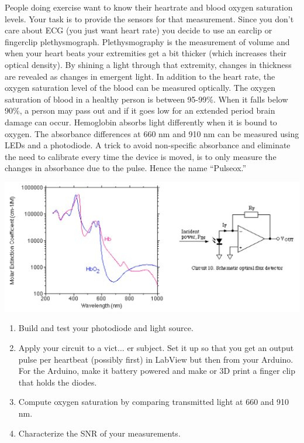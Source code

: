\documentclass[12pt]{article}
\begin{document}
People doing exercise want to know their heartrate and blood oxygen saturation levels.
Your task is to provide the sensors for that measurement. 
Since you don't care about ECG (you just want heart rate) you decide to use an earclip or fingerclip plethysmograph. 
Plethysmography is the measurement of volume and when your heart beats your extremities get a bit thicker (which increases their optical density). 
By shining a light through that extremity, changes in thickness are revealed as changes in emergent light. 
In addition to the heart rate, the oxygen saturation level of the blood can be measured optically. 
The oxygen saturation of blood in a healthy person is between 95-99\%. 
When it falls below 90\%, a person may pass out and if it goes low for an extended period brain damage can occur. 
Hemoglobin absorbs light differently when it is bound to oxygen. 
The absorbance differences at 660 nm and 910 nm can be measured using LEDs and a photodiode. 
A trick to avoid non-specific absorbance and eliminate the need to calibrate every time the device is moved, 
is to only measure the changes in absorbance due to the pulse. 
Hence the name ``Pulseox.''
\begin{centering}
\includegraphics[width=\textwidth]{plethysmograph.png}
\end{centering}
\begin{enumerate}
\item Build and test your photodiode and light source. 
\item Apply your circuit to a vict... er subject. Set it up so that you get an output pulse per heartbeat (possibly first) in LabView but then from your Arduino. For the Arduino, make it battery powered and make or 3D print a finger clip that holds the diodes. 
\item Compute oxygen saturation by comparing transmitted light at 660 and 910 nm. 
\item Characterize the SNR of your measurements.
\end{enumerate}
\end{document}
